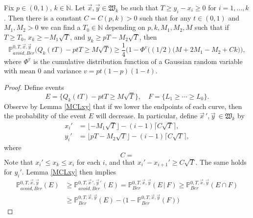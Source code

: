 \begin{lemma}\label{prob19}
	Fix $p\in(0,1)$, $k\in\mathbb{N}$. Let $\vec{x},\vec{y}\in\mathfrak{W}_k$ be such that $T \geq y_i - x_i \geq 0$ for $i=1,\dots,k$. Then there is a constant $C = C(p,k) > 0$ such that for any $t\in (0,1)$ and $M_1,M_2 > 0$ we can find a $T_0\in\mathbb{N}$ depending on $p,k,M_1,M_2,M$ such that if $T\geq T_0$, $x_k \geq - M_1\sqrt{T}$, and $y_k \geq pT - M_2\sqrt{T}$, then
	\[
	\mathbb{P}^{0,T,\vec{x},\vec{y}}_{avoid, Ber}\Big(Q_k(tT) - ptT \geq M\sqrt{T}\Big) \geq \frac{1}{4}\Big( 1 - \Phi^v\big((1/2)(M + 2M_1 - M_2 + Ck\big)\Big),
	\]
	where $\Phi^v$ is the cumulative distribution function of a Gaussian random variable with mean 0 and variance $v=pt(1-p)(1-t)$.
\end{lemma}

\begin{proof}
	Define events
	$$ E = \Big\{ Q_k(tT) - ptT \geq M\sqrt{T} \Big\}, \quad F = \{L_1 \geq \cdots \geq L_k\}.$$
	Observe by Lemma \ref{MCLxy} that if we lower the endpoints of each curve, then the probability of the event $E$ will decrease. 
	In particular, define $\vec{x}\,',\vec{y}\, \in \mathfrak{W}_k$ by
	\begin{align*}
	x_i' &= \lfloor -M_1\sqrt{T}\rfloor - (i-1)\lceil C\sqrt{T}\rceil,\\
	y_i' &= \lfloor pT - M_2\sqrt{T}\rfloor - (i-1)\lceil C\sqrt{T}\rceil,
	\end{align*}
	where
	\begin{equation}\label{19C}
	C = 
	\end{equation}
	Note that $x_i' \leq x_k \leq x_i$ for each $i$, and that $x_i'-x_{i+1}'\geq C\sqrt{T}$. The same holds for $y_i'$. Lemma \ref{MCLxy} then implies
	\begin{align*}
	\mathbb{P}_{avoid, Ber}^{0,T, \vec{x}, \vec{y}}(E) &\geq \mathbb{P}_{avoid, Ber}^{0,T, \vec{x}\,', \vec{y}\,'}(E) = \mathbb{P}^{0,T,\vec{x},\vec{y}}_{Ber}(E\,|\,F) \geq \mathbb{P}^{0,T,\vec{x},\vec{y}}_{Ber} (E\cap F)\\ 
	& \geq \mathbb{P}^{0,T,\vec{x},\vec{y}}_{Ber}(E) - \big(1-\mathbb{P}^{0,T,\vec{x},\vec{y}}_{Ber}(F)\big)
	\end{align*}
	

\end{proof}
